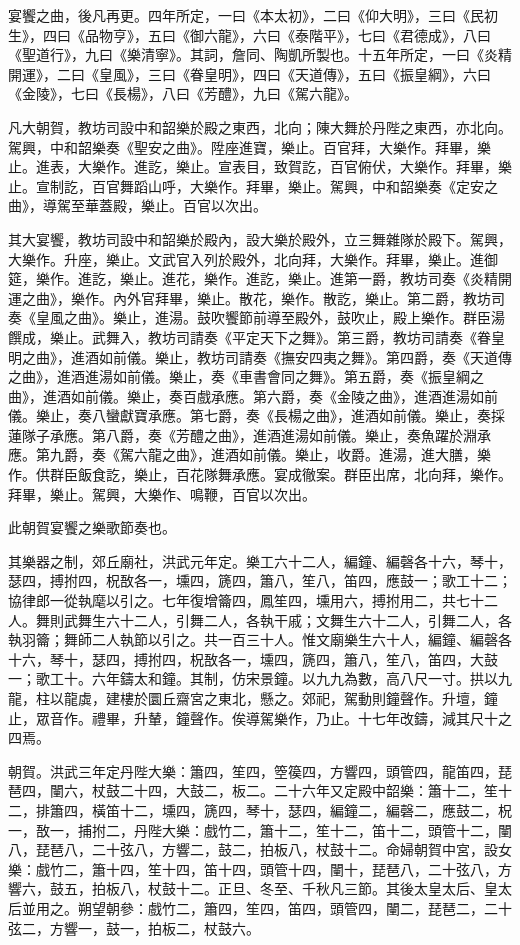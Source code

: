 宴饗之曲，後凡再更。四年所定，一曰《本太初》，二曰《仰大明》，三曰《民初生》，四曰《品物亨》，五曰《御六龍》，六曰《泰階平》，七曰《君德成》，八曰《聖道行》，九曰《樂清寧》。其詞，詹同、陶凱所製也。十五年所定，一曰《炎精開運》，二曰《皇風》，三曰《眷皇明》，四曰《天道傳》，五曰《振皇綱》，六曰《金陵》，七曰《長楊》，八曰《芳醴》，九曰《駕六龍》。

凡大朝賀，教坊司設中和韶樂於殿之東西，北向；陳大舞於丹陛之東西，亦北向。駕興，中和韶樂奏《聖安之曲》。陞座進寶，樂止。百官拜，大樂作。拜畢，樂止。進表，大樂作。進訖，樂止。宣表目，致賀訖，百官俯伏，大樂作。拜畢，樂止。宣制訖，百官舞蹈山呼，大樂作。拜畢，樂止。駕興，中和韶樂奏《定安之曲》，導駕至華蓋殿，樂止。百官以次出。

其大宴饗，教坊司設中和韶樂於殿內，設大樂於殿外，立三舞雜隊於殿下。駕興，大樂作。升座，樂止。文武官入列於殿外，北向拜，大樂作。拜畢，樂止。進御筵，樂作。進訖，樂止。進花，樂作。進訖，樂止。進第一爵，教坊司奏《炎精開運之曲》，樂作。內外官拜畢，樂止。散花，樂作。散訖，樂止。第二爵，教坊司奏《皇風之曲》。樂止，進湯。鼓吹饗節前導至殿外，鼓吹止，殿上樂作。群臣湯饌成，樂止。武舞入，教坊司請奏《平定天下之舞》。第三爵，教坊司請奏《眷皇明之曲》，進酒如前儀。樂止，教坊司請奏《撫安四夷之舞》。第四爵，奏《天道傳之曲》，進酒進湯如前儀。樂止，奏《車書會同之舞》。第五爵，奏《振皇綱之曲》，進酒如前儀。樂止，奏百戲承應。第六爵，奏《金陵之曲》，進酒進湯如前儀。樂止，奏八蠻獻寶承應。第七爵，奏《長楊之曲》，進酒如前儀。樂止，奏採蓮隊子承應。第八爵，奏《芳醴之曲》，進酒進湯如前儀。樂止，奏魚躍於淵承應。第九爵，奏《駕六龍之曲》，進酒如前儀。樂止，收爵。進湯，進大膳，樂作。供群臣飯食訖，樂止，百花隊舞承應。宴成徹案。群臣出席，北向拜，樂作。拜畢，樂止。駕興，大樂作、鳴鞭，百官以次出。

此朝賀宴饗之樂歌節奏也。

其樂器之制，郊丘廟社，洪武元年定。樂工六十二人，編鐘、編磬各十六，琴十，瑟四，搏拊四，柷敔各一，壎四，篪四，簫八，笙八，笛四，應鼓一；歌工十二；協律郎一從執麾以引之。七年復增籥四，鳳笙四，壎用六，搏拊用二，共七十二人。舞則武舞生六十二人，引舞二人，各執干戚；文舞生六十二人，引舞二人，各執羽籥；舞師二人執節以引之。共一百三十人。惟文廟樂生六十人，編鐘、編磬各十六，琴十，瑟四，搏拊四，柷敔各一，壎四，篪四，簫八，笙八，笛四，大鼓一；歌工十。六年鑄太和鐘。其制，仿宋景鐘。以九九為數，高八尺一寸。拱以九龍，柱以龍虡，建樓於圜丘齋宮之東北，懸之。郊祀，駕動則鐘聲作。升壇，鐘止，眾音作。禮畢，升輦，鐘聲作。俟導駕樂作，乃止。十七年改鑄，減其尺十之四焉。

朝賀。洪武三年定丹陛大樂：簫四，笙四，箜篌四，方響四，頭管四，龍笛四，琵琶四，闉六，杖鼓二十四，大鼓二，板二。二十六年又定殿中韶樂：簫十二，笙十二，排簫四，橫笛十二，壎四，篪四，琴十，瑟四，編鐘二，編磬二，應鼓二，柷一，敔一，捕拊二，丹陛大樂：戲竹二，簫十二，笙十二，笛十二，頭管十二，闉八，琵琶八，二十弦八，方響二，鼓二，拍板八，杖鼓十二。命婦朝賀中宮，設女樂：戲竹二，簫十四，笙十四，笛十四，頭管十四，闉十，琵琶八，二十弦八，方響六，鼓五，拍板八，杖鼓十二。正旦、冬至、千秋凡三節。其後太皇太后、皇太后並用之。朔望朝參：戲竹二，簫四，笙四，笛四，頭管四，闉二，琵琶二，二十弦二，方響一，鼓一，拍板二，杖鼓六。

